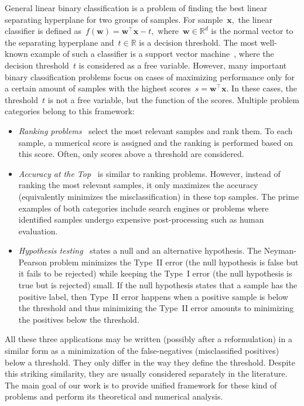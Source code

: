 \documentclass[11pt,a4paper]{article}
\theoremstyle{definition}
\newcommand{\R}{\mathbb{R}}
\begin{document}
General linear binary classification is a problem of finding the best linear separating hyperplane for two groups of samples.  For sample~$\bm{x},$ the linear classifier is defined as~$f(\bm{w}) = \bm{w}^{\top} \bm{x} - t,$ where~$\bm{w} \in \R^{d}$ is the normal vector to the separating hyperplane and~$t \in \R$ is a decision threshold. The most well-known example of such a classifier is a support vector machine~\cite{cortes1995support}, where the decision threshold~$t$ is considered as a free variable. However, many important binary classification problems focus on cases of maximizing performance only for a certain amount of samples with the highest scores~$s = \bm{w}^{\top}\bm{x}.$ In these cases, the threshold~$t$ is not a free variable, but the function of the scores. Multiple problem categories belong to this framework:
\begin{itemize}
  \item \textit{Ranking problems}~\cite{agarwal2011infinite,freund2003efficient,rudin2009p,li2014top} select the most relevant samples and rank them. To each sample, a numerical score is assigned and the ranking is performed based on this score. Often, only scores above a threshold are considered.
  \item \textit{Accuracy at the Top}~\cite{boyd2012accuracy,grill2016learning,tasche2018plug} is similar to ranking problems. However, instead of ranking the most relevant samples, it only maximizes the accuracy (equivalently minimizes the misclassification) in these top samples. The prime examples of both categories include search engines or problems where identified samples undergo expensive post-processing such as human evaluation.
  \item \textit{Hypothesis testing}~\cite{neyman1933ix} states a null and an alternative hypothesis. The Neyman-Pearson problem minimizes the Type~II error (the null hypothesis is false but it fails to be rejected) while keeping the Type~I error (the null hypothesis is true but is rejected) small. If the null hypothesis states that a sample has the positive label, then Type~II error happens when a positive sample is below the threshold and thus minimizing the Type~II error amounts to minimizing the positives below the threshold.
\end{itemize}
All these three applications may be written (possibly after a reformulation) in a similar form as a minimization of the false-negatives (misclassified positives) below a threshold. They only differ in the way they define the threshold. Despite this striking similarity, they are usually considered separately in the literature. The main goal of our work is to provide unified framework for these kind of problems and perform its theoretical and numerical analysis.
\end{document}
